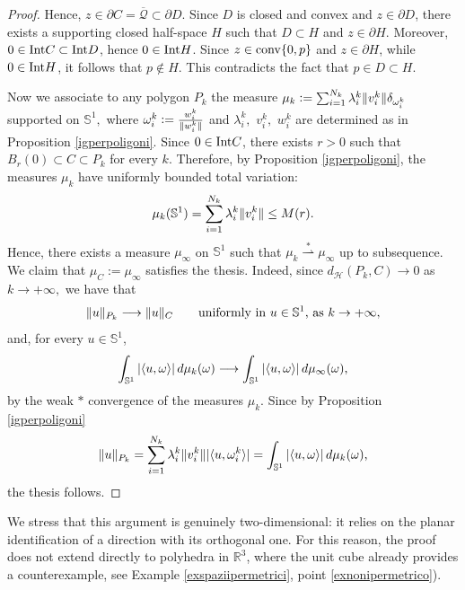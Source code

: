 \documentclass{article}
\numberwithin{equation}{section}
\theoremstyle{plain}%
\theoremstyle{definition}
\theoremstyle{definition}
\newcommand{\rgrande}{\mathbb{R}}
\newcommand{\haus}{\mathcal{H}}
\newcommand{\sfera}{\mathbb{S}}
\newcommand{\conv}{{\rm conv}}
\newcommand{\interno}{{\rm Int}}
\DeclarePairedDelimiter{\norma}{\lVert}{\rVert} %
\DeclarePairedDelimiter{\valass}{\lvert}{\rvert} %
\newcommand{\prodscal}[2]{\langle{#1} , {#2} \rangle}
\begin{document}
\begin{proof}
Hence, $z\in \partial C = \overline{\mathcal{Q}} \subset \partial D$.
Since $D$ is closed and convex and $z\in \partial D$, there exists a supporting closed half-space $H$ such that
$D\subset H$ and $z\in \partial H$.
Moreover, $0\in \interno C\subset \interno D$, hence $0\in \interno H$.
Since $z\in \conv\{0,p\}$ and $z\in \partial H$, while $0\in \interno H$, it follows that
$p\notin H$.
This contradicts the fact that $p\in D\subset H$.


Now we associate to any polygon $P_k$ the measure $\mu_k \vcentcolon = \sum_{i=1}^{N_k} \lambda_i^k \norma{v_i^k} \delta_{\omega_i^k}$ supported on $\sfera^1,$ where $\omega_i^k \vcentcolon = \frac{w_i^k}{\norma{w_i^k}}$ and $\lambda_i^k,$ $v_i^k,$ $w_i^k$ are determined as in Proposition \ref{igperpoligoni}.
Since $0\in\interno C$, there exists $r>0$ such that $B_r(0)\subset C\subset P_k$ for every $k$. Therefore, by Proposition \ref{igperpoligoni}, the measures $\mu_k$ have uniformly bounded total variation:
$$
\mu_k(\sfera^1)=\sum_{i=1}^{N_k}\lambda_i^k\norma{v_i^k}\le M(r).
$$
Hence, there exists a measure $\mu_{\infty}$ on $\sfera^1$ such that
    $
    \mu_k \stackrel{\ast}{\rightharpoonup}
 \mu_{\infty}
    $
    up to subsequence. We claim that $\mu_C:=\mu_{\infty}$ satisfies the thesis. Indeed, since $d_{\haus} (P_k,C) \longrightarrow 0$ as $k \to + \infty,$ we have that
    $$
    \norma{u}_{P_k} \longrightarrow \norma{u}_C  \qquad \text{uniformly in $u\in\sfera^1$, as } k \to + \infty,
    $$
    and, for every $u\in\sfera^1$,
    $$
    \int_{\sfera^1} {\valass{\prodscal{u}{\omega}}} \,d \mu_k(\omega)
    \longrightarrow
    \int_{\sfera^1} {\valass{\prodscal{u}{\omega}}} \,d \mu_{\infty}(\omega)
    \text{,}
    $$
    by the weak $*$ convergence of the measures $\mu_k.$
    Since by Proposition \ref{igperpoligoni}
    $$
    \norma{u}_{P_k} =
    \sum_{i = 1}^{N_k} \lambda_i^k \norma{v_i^k} \valass{\prodscal{u}{\omega_i^k}} = \int_{\sfera^1} {\valass{\prodscal{u}{\omega}}} \,d \mu_k(\omega)
    \text{,}
    $$
    the thesis follows.
\end{proof}

We stress that this argument is genuinely two-dimensional: it relies on the planar identification of a direction with its orthogonal one. For this reason, the proof does not extend directly to polyhedra in $\rgrande^3$, where the unit cube already provides a counterexample, see Example \ref{exspaziipermetrici}, point \ref{exnonipermetrico}).
\end{document}
